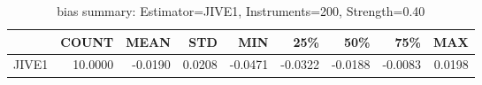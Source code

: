 \begin{table}[ht]
\centering
\caption{bias summary: Estimator=JIVE1, Instruments=200, Strength=0.40}
\begin{tabular}{lrrrrrrrr}
\toprule
 & COUNT & MEAN & STD & MIN & 25\% & 50\% & 75\% & MAX \\
\midrule
JIVE1 & 10.0000 & -0.0190 & 0.0208 & -0.0471 & -0.0322 & -0.0188 & -0.0083 & 0.0198 \\
\bottomrule
\end{tabular}
\end{table}
